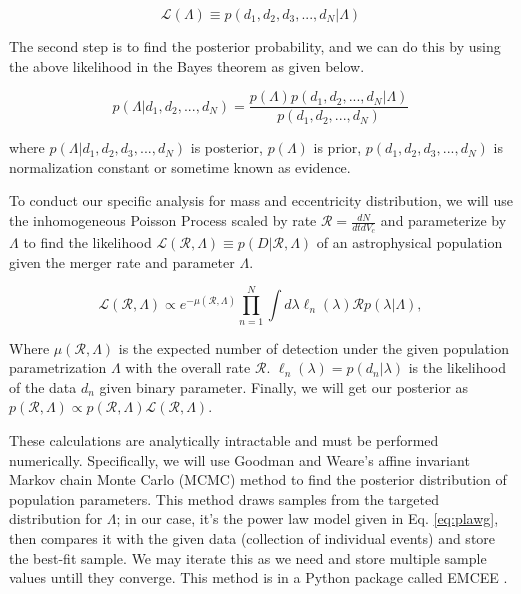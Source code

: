 \documentclass[twocolumn,prd,nofootinbib]{revtex4}
\begin{document}
\begin{equation}
\label{eq:likelihood_pop}    
\mathcal{L}(\Lambda)\equiv p(d_1,d_2,d_3,...,d_N|\Lambda)
\end{equation}

 

The second step is to find the posterior probability, and we can do this by using the above likelihood in the Bayes theorem as given below.

\begin{equation}
\label{eq:Bayes}    
p(\Lambda|d_1,d_2,...,d_N)= \frac{p(\Lambda)p(d_1,d_2,...,d_N|\Lambda)}{p(d_1,d_2,...,d_N)}
\end{equation}

where $p(\Lambda|d_1,d_2,d_3,...,d_N)$ is posterior, $p(\Lambda)$ is prior, $p(d_1,d_2,d_3,...,d_N)$ is normalization constant or sometime known as evidence.

To conduct our specific analysis for mass and eccentricity distribution, we will use the inhomogeneous Poisson Process scaled by rate $\mathcal{R} = \frac{dN}{dtdV_c}$ and parameterize by $\Lambda$ to find the likelihood  $\mathcal{L}(\mathcal{R},\Lambda)\equiv p(D|\mathcal{R},\Lambda)$ of an astrophysical population given the merger rate and parameter $\Lambda$. 

\begin{equation}
\label{eq: likelihood}
\mathcal{L}(\mathcal{R},\Lambda) \propto e^{-\mu(\mathcal{R},\Lambda)}\prod_{n=1}^N\int d\lambda \ell_n(\lambda) \mathcal{R} p(\lambda|\Lambda),
\end{equation}

Where $\mu(\mathcal{R},\Lambda)$ is the expected number of detection under the given population parametrization $\Lambda$ with the overall rate $\mathcal{R}$. $\ell_n(\lambda)=p(d_n|\lambda)$ is the likelihood of the data $d_n$ given binary parameter.
Finally, we will get our posterior as $p(\mathcal{R},\Lambda)\propto p(\mathcal{R},\Lambda)  \mathcal{L}(\mathcal{R},\Lambda)$.

These calculations are analytically intractable and must be performed numerically. Specifically, we will use Goodman and Weare's affine invariant Markov chain Monte Carlo (MCMC) \cite{mcmc_paper} method to find the posterior distribution of population parameters. This method draws samples from the targeted distribution for $\Lambda$; in our case, it's the power law model given in Eq. \ref{eq:plawg}, then compares it with the given data (collection of individual events) and store the best-fit sample. We may iterate this as we need and store multiple sample values untill they converge. 
This method is in a Python package called EMCEE \cite{emcee_paper}.
\end{document}
